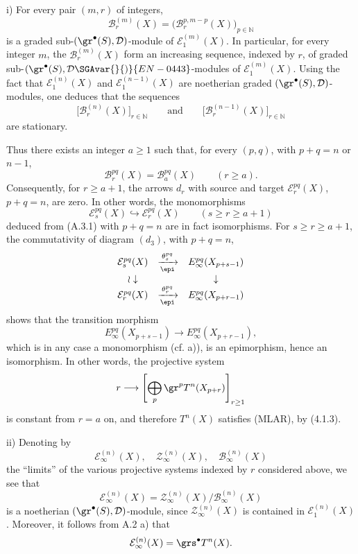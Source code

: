 \begin{prooftext}
i) For every pair \((m,r)\) of integers,
\[
\mathcal B_r^{(m)}(X)=\bigl(\mathcal B_r^{p,m-p}(X)\bigr)_{p\in\mathbb N}
\]
is a graded sub-\((\gr^\bullet(S),\mathcal D)\)-module of \(\mathcal E_1^{(m)}(X)\). In particular, for every integer \(m\), the \(\mathcal B_r^{(m)}(X)\) form an increasing sequence, indexed by \(r\), of graded sub-\((\gr^\bullet(S),\mathcal D\SGAvar{}{)}{EN-0443}\)-modules of \(\mathcal E_1^{(m)}(X)\). Using the fact that \(\mathcal E_1^{(n)}(X)\) and \(\mathcal E_1^{(n-1)}(X)\) are noetherian graded \((\gr^\bullet(S),\mathcal D)\)-modules, one deduces that the sequences
\[
\bigl[\mathcal B_r^{(n)}(X)\bigr]_{r\in\mathbb N}
\qquad\text{and}\qquad
\bigl[\mathcal B_r^{(n-1)}(X)\bigr]_{r\in\mathbb N}
\]
are stationary.

Thus there exists an integer \(a\ge1\) such that, for every \((p,q)\), with \(p+q=n\) or \(n-1\),
\begin{equation}
\mathcal B_r^{pq}(X)=\mathcal B_a^{pq}(X)\qquad(r\ge a).
\tag{A.3.1}
\end{equation}
Consequently, for \(r\ge a+1\), the arrows \(d_r\) with source and target \(\mathcal E_r^{pq}(X)\), \(p+q=n\), are zero. In other words, the monomorphisms
\[
\mathcal E_s^{pq}(X)\hookrightarrow\mathcal E_r^{pq}(X)\qquad(s\ge r\ge a+1)
\]
deduced from (A.3.1) with \(p+q=n\) are in fact isomorphisms. For \(s\ge r\ge a+1\), the commutativity of diagram \((d_3)\), with \(p+q=n\),
\[
\begin{array}{ccc}
\mathcal E_s^{pq}(X)&\xrightarrow[\epi]{\theta_s^{pq}}&E_\infty^{pq}(X_{p+s-1})\\
\wr\downarrow&&\downarrow\\
\mathcal E_r^{pq}(X)&\xrightarrow[\epi]{\theta_r^{pq}}&E_\infty^{pq}(X_{p+r-1})
\end{array}
\]
shows that the transition morphism
\[
E_\infty^{pq}(X_{p+s-1})\longrightarrow E_\infty^{pq}(X_{p+r-1}),
\]
which is in any case a monomorphism (cf. a)), is an epimorphism, hence an isomorphism. In other words, the projective system
\[
r\longrightarrow\left[\bigoplus_p\gr^p T^n(X_{p+r})\right]_{r\ge1}
\]
is constant from \(r=a\) on, and therefore \(T^n(X)\) satisfies (MLAR), by (4.1.3).

ii) Denoting by
\[
\mathcal E_\infty^{(n)}(X),\quad
\mathcal Z_\infty^{(n)}(X),\quad
\mathcal B_\infty^{(n)}(X)
\]
the “limits” of the various projective systems indexed by \(r\) considered above, we see that
\[
\mathcal E_\infty^{(n)}(X)=
\mathcal Z_\infty^{(n)}(X)/\mathcal B_\infty^{(n)}(X)
\]
is a noetherian %
\((\gr^\bullet(S),\mathcal D)\)-module, since \(\mathcal Z_\infty^{(n)}(X)\) is contained in \(\mathcal E_1^{(n)}(X)\). Moreover, it follows from A.2 a) that
\[
\mathcal E_\infty^{(n)}(X)=\grs^\bullet T^n(X).
\]
\end{prooftext}


